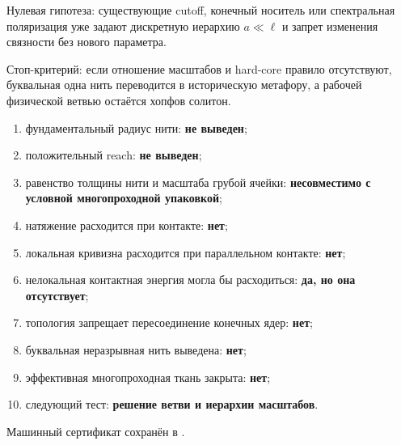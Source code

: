 Нулевая гипотеза: существующие cutoff, конечный носитель или спектральная
поляризация уже задают дискретную иерархию $a\ll\ell$ и запрет изменения
связности без нового параметра.

Стоп-критерий: если отношение масштабов и hard-core правило отсутствуют,
буквальная одна нить переводится в историческую метафору, а рабочей
физической ветвью остаётся хопфов солитон.

\begin{protocol}
\begin{enumerate}
 \item фундаментальный радиус нити: \textbf{не выведен};
 \item положительный reach: \textbf{не выведен};
 \item равенство толщины нити и масштаба грубой ячейки:
 \textbf{несовместимо с условной многопроходной упаковкой};
 \item натяжение расходится при контакте: \textbf{нет};
 \item локальная кривизна расходится при параллельном контакте:
 \textbf{нет};
 \item нелокальная контактная энергия могла бы расходиться:
 \textbf{да, но она отсутствует};
 \item топология запрещает пересоединение конечных ядер: \textbf{нет};
 \item буквальная неразрывная нить выведена: \textbf{нет};
 \item эффективная многопроходная ткань закрыта: \textbf{нет};
 \item следующий тест: \textbf{решение ветви и иерархии масштабов}.
\end{enumerate}
\end{protocol}

Машинный сертификат сохранён в
.

